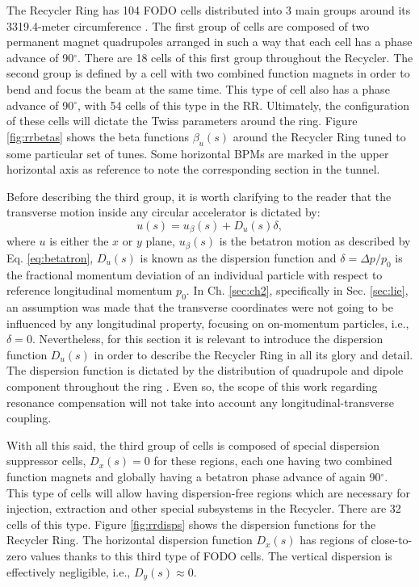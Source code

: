 The Recycler Ring has 104 FODO cells distributed into 3 main groups around its 3319.4-meter circumference \cite{rr0}. The first group of cells are composed of two permanent magnet quadrupoles arranged in such a way that each cell has a phase advance of 90$^{\circ}$. There are 18 cells of this first group throughout the Recycler. The second group is defined by a cell with two combined function magnets in order to bend and focus the beam at the same time. This type of cell also has a phase advance of 90$^{\circ}$, with 54 cells of this type in the RR. Ultimately, the configuration of these cells will dictate the Twiss parameters around the ring. Figure \ref{fig:rrbetas} shows the beta functions $\beta_u(s)$ around the Recycler Ring tuned to some particular set of tunes. Some horizontal BPMs are marked in the upper horizontal axis as reference to note the corresponding section in the tunnel.    

Before describing the third group, it is worth clarifying to the reader that the transverse motion inside any circular accelerator is dictated by:
\begin{equation}
   \label{eq:utotal}
   u(s) = u_{\beta}(s) + D_u(s) \delta,
\end{equation}
where $u$ is either the $x$ or $y$ plane, $u_{\beta}(s)$ is the betatron motion as described by Eq. \ref{eq:betatron}, $D_u(s)$ is known as the dispersion function and $\delta=\Delta p/p_0$ is the fractional momentum deviation of an individual particle with respect to reference longitudinal momentum $p_0$. In Ch. \ref{sec:ch2}, specifically in Sec. \ref{sec:lie}, an assumption was made that the transverse coordinates were not going to be influenced by any longitudinal property, focusing on on-momentum particles, i.e., $\delta =0$. Nevertheless, for this section it is relevant to introduce the dispersion function $D_u(s)$ in order to describe the Recycler Ring in all its glory and detail. The dispersion function is dictated by the distribution of quadrupole and dipole component throughout the ring \cite{sylee}. Even so, the scope of this work regarding resonance compensation will not take into account any longitudinal-transverse coupling.   

With all this said, the third group of cells is composed of special dispersion suppressor cells, $D_x(s)=0$ for these regions, each one having two combined function magnets and globally having a betatron phase advance of again 90$^{\circ}$. This type of cells will allow having dispersion-free regions which are necessary for injection, extraction and other special subsystems in the Recycler. There are 32 cells of this type. Figure \ref{fig:rrdisps} shows the dispersion functions for the Recycler Ring. The horizontal dispersion function $D_x(s)$ has regions of close-to-zero values thanks to this third type of FODO cells. The vertical dispersion is effectively negligible, i.e., $D_y(s)\approx 0$.

